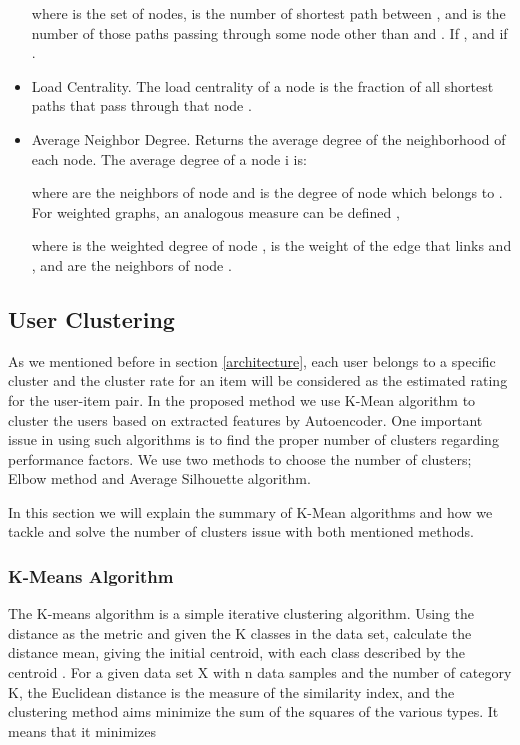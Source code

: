 \documentclass[a4paper,fleqn]{cas-dc}
\begin{document}
\begin{itemize}
	      

	      where  is the set of nodes,  is the number of shortest path between , and  is the number of those paths passing through some node  other than  and . If   , and if    \citep{47brandes2008a}.

	\item Load Centrality. The load centrality of a node is the fraction of all shortest paths that pass through that node \citep{48newman2001a}.

	\item Average Neighbor Degree. Returns the average degree of the neighborhood of each node. The average degree of a node i is:

	      

	      where  are the neighbors of node  and  is the degree of node  which belongs to . For weighted graphs, an analogous measure can be defined \citep{49barrat2004a},

	      

	      where  is the weighted degree of node ,  is the weight of the edge that links  and , and  are the neighbors of node .

\end{itemize}


\subsection{User Clustering}
\label{clustering}
As we mentioned before in section \ref{architecture}, each user belongs to a specific cluster and the cluster rate for an item will be considered as the estimated rating for the user-item pair. In the proposed method we use K-Mean algorithm to cluster the users based on extracted features by Autoencoder. One important issue in using such algorithms is to find the proper number of clusters regarding performance factors. We use two methods to choose the number of clusters; Elbow method and Average Silhouette algorithm.

In this section we will explain the summary of K-Mean algorithms and how we tackle and solve the number of clusters issue with both mentioned methods.

\subsubsection{K-Means Algorithm}
\label{kmeans}
The K-means algorithm is a simple iterative clustering algorithm. Using the distance as the metric and given the K classes in the data set, calculate the distance mean, giving the initial centroid, with each class described by the centroid \citep{57yuan2019a, 60m2015a}. For a given data set X with n data samples and the number of category K, the Euclidean distance is the measure of the similarity index, and the clustering method aims minimize the sum of the squares of the various types. It means that it minimizes \citep{58wang2012a}
\end{document}
